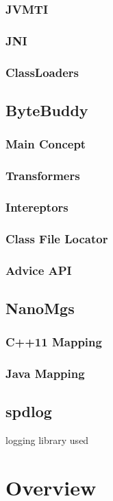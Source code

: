 \documentclass[12pt,a4paper]{report}
\begin{document}
\subsection{JVMTI}
\subsection{JNI}
\subsection{ClassLoaders}
\section{ByteBuddy}
\subsection{Main Concept}
\subsection{Transformers}
\subsection{Intereptors}
\subsection{Class File Locator}
\subsection{Advice API}
\section{NanoMgs}
\subsection{C++11 Mapping}
\subsection{Java Mapping}
\section{spdlog}
logging library used


\chapter{Overview}
\end{document}
